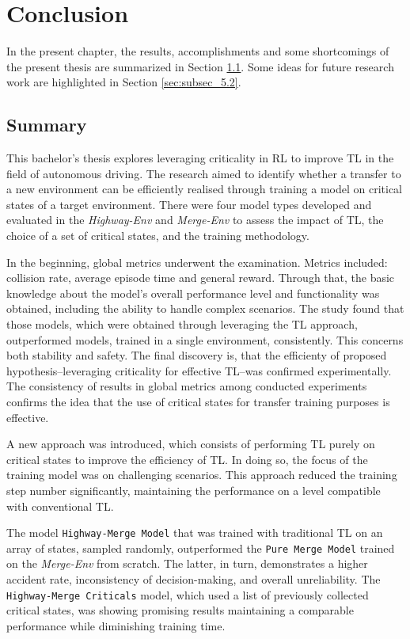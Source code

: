 \clearpage

\section{Conclusion}\label{chap:chap_5}

In the present chapter, the results, accomplishments and some shortcomings of the present thesis are summarized in Section \ref{sec:subsec_5.1}. Some ideas for future research work are highlighted in Section \ref{sec:subsec_5.2}.

\subsection{Summary}\label{sec:subsec_5.1}

This bachelor's thesis explores leveraging criticality in RL to improve TL in the field of autonomous driving. The research aimed to identify whether a transfer to a new environment can be efficiently realised through training a model on critical states of a target environment. There were four model types developed and evaluated in the \emph{Highway-Env} and \emph{Merge-Env} to assess the impact of TL, the choice of a set of critical states, and the training methodology.

In the beginning, global metrics underwent the examination. Metrics included: collision rate, average episode time and general reward. Through that, the basic knowledge about the model's overall performance level and functionality was obtained, including the ability to handle complex scenarios. The study found that those models, which were obtained through leveraging the TL approach, outperformed models, trained in a single environment, consistently. This concerns both stability and safety. The final discovery is, that the efficienty of proposed hypothesis--leveraging criticality for effective TL--was confirmed experimentally. The consistency of results in global metrics among conducted experiments confirms the idea that the use of critical states for transfer training purposes is effective.

A new approach was introduced, which consists of performing TL purely on critical states to improve the efficiency of TL. In doing so, the focus of the training model was on challenging scenarios. This approach reduced the training step number significantly, maintaining the performance on a level compatible with conventional TL.

The model \texttt{Highway-Merge Model} that was trained with traditional TL on an array of states, sampled randomly, outperformed the \texttt{Pure Merge Model} trained on the \emph{Merge-Env} from scratch. The latter, in turn, demonstrates a higher accident rate, inconsistency of decision-making, and overall unreliability. The \texttt{Highway-Merge Criticals} model, which used a list of previously collected critical states, was showing promising results maintaining a comparable performance while diminishing training time.

